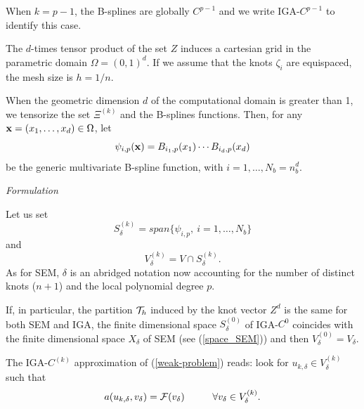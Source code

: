 \documentclass[11pt]{article}
\newcommand{\pg}{\color{red}}
\begin{document}
When $k=p-1$, the
B-splines are globally $C^{p-1}$ and we write IGA-$C^{p-1}$ to identify this
case.

The $d$-times tensor product of the set $Z$ induces a cartesian
grid in the parametric domain $\Omega=(0,1)^d$. 
If we assume that the knots $\zeta_i$ are equispaced,
 the mesh size is $h=1/n$.

When the geometric dimension $d$ of the computational domain is greater than 1, 
 we tensorize the set $\Xi^{(k)}$ and the 
B-splines functions. Then, for any ${\bf x}=(x_1,\ldots,x_d)\in \Omega$, let
\begin{equation}\label{tensor-bspline}
\psi_{i,p}({\bf x})=B_{i_1,p}(x_1)\cdots B_{i_d,p}(x_d)
\end{equation}
be the generic multivariate B-spline function, with $i=1,\ldots,N_b=n_b^d$.

\null
\emph{Formulation}

Let us set
\begin{equation}\label{Bspline_space}
S_\delta^{(k)}=span\{\psi_{i,p},\ i=1,\ldots,N_b\}
\end{equation}
and
\begin{equation}\label{space_IGA}
V_\delta^{(k)}=V\cap S_\delta^{(k)}.
\end{equation}
As for SEM, $\delta$ is an abridged notation now
accounting for  the number of distinct knots ($n+1$)
and the local polynomial degree $p$.


If, in particular, the partition ${\cal T}_h$ induced by the knot vector 
$Z^d$
is the same for both SEM and IGA, 
the finite dimensional
space $S^{(0)}_\delta$ of IGA-$C^0$ coincides with the finite dimensional 
space $X_\delta$ of SEM (see (\ref{space_SEM}))
and then $V_\delta^{(0)}=V_\delta$.

The IGA-$C^{(k)}$ approximation of (\ref{weak-problem}) reads: look for 
$u_{k,\delta}\in V_\delta^{(k)}$ such that
\begin{equation}\label{iga-weak-problem}
a(u_{k,\delta},v_\delta)={\cal F}(v_\delta)\hskip 1.cm \forall 
v_\delta\in V_\delta^{(k)}.
\end{equation}
\end{document}
